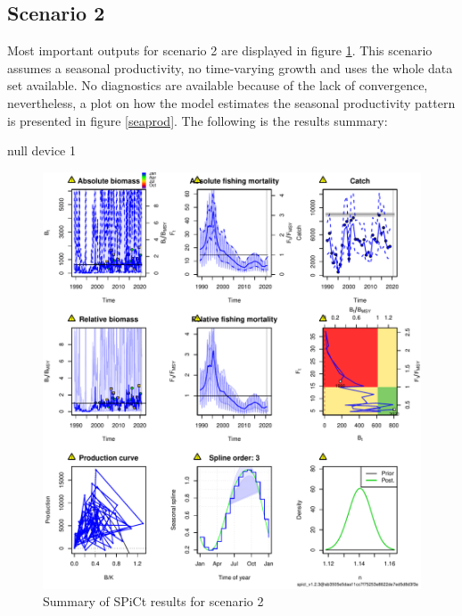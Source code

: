 \documentclass[review]{elsarticle}
\begin{document}
\clearpage
\subsection{Scenario 2}
Most important outputs for scenario 2 are displayed in figure \ref{scenario2out}. This scenario assumes a seasonal productivity, no time-varying growth and uses the whole data set available. No diagnostics are available because of the lack of convergence, nevertheless, a plot on how the model estimates the seasonal productivity pattern is presented in figure \ref{seaprod}. The following is the results summary:

\begin{Schunk}
\begin{Soutput}
null device 
          1 
\end{Soutput}
\end{Schunk}


\begin{figure}[h!]
 \centering
 \includegraphics[]{./scenario2out.pdf}
 \caption{Summary of SPiCt results for scenario 2}
 \label{scenario2out}
\end{figure}
\end{document}
